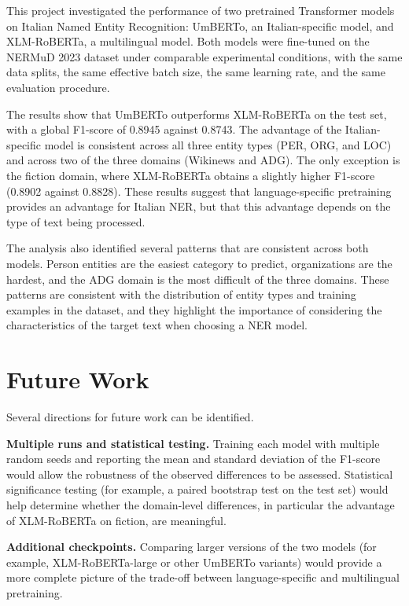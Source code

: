 This project investigated the performance of two pretrained Transformer models on Italian Named Entity Recognition: UmBERTo, an Italian-specific model, and XLM-RoBERTa, a multilingual model. Both models were fine-tuned on the NERMuD 2023 dataset under comparable experimental conditions, with the same data splits, the same effective batch size, the same learning rate, and the same evaluation procedure.

The results show that UmBERTo outperforms XLM-RoBERTa on the test set, with a global F1-score of 0.8945 against 0.8743. The advantage of the Italian-specific model is consistent across all three entity types (PER, ORG, and LOC) and across two of the three domains (Wikinews and ADG). The only exception is the fiction domain, where XLM-RoBERTa obtains a slightly higher F1-score (0.8902 against 0.8828). These results suggest that language-specific pretraining provides an advantage for Italian NER, but that this advantage depends on the type of text being processed.

The analysis also identified several patterns that are consistent across both models. Person entities are the easiest category to predict, organizations are the hardest, and the ADG domain is the most difficult of the three domains. These patterns are consistent with the distribution of entity types and training examples in the dataset, and they highlight the importance of considering the characteristics of the target text when choosing a NER model.

\section{Future Work}
\label{sec:future-work}

Several directions for future work can be identified.

\textbf{Multiple runs and statistical testing.} Training each model with multiple random seeds and reporting the mean and standard deviation of the F1-score would allow the robustness of the observed differences to be assessed. Statistical significance testing (for example, a paired bootstrap test on the test set) would help determine whether the domain-level differences, in particular the advantage of XLM-RoBERTa on fiction, are meaningful.

\textbf{Additional checkpoints.} Comparing larger versions of the two models (for example, XLM-RoBERTa-large or other UmBERTo variants) would provide a more complete picture of the trade-off between language-specific and multilingual pretraining.

